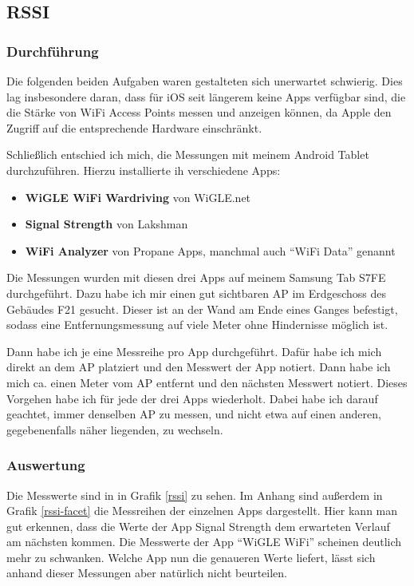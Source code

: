 \subsection{RSSI}
\label{sec:rssi}

\subsubsection*{Durchführung}
Die folgenden beiden Aufgaben waren gestalteten sich unerwartet schwierig. Dies lag insbesondere daran, dass für iOS seit längerem keine Apps verfügbar sind, die die Stärke von WiFi Access Points messen und anzeigen können, da Apple den Zugriff auf die entsprechende Hardware einschränkt.

Schließlich entschied ich mich, die Messungen mit meinem Android Tablet durchzuführen. Hierzu installierte ih verschiedene Apps:

\begin{itemize}
    \item \textbf{WiGLE WiFi Wardriving} von WiGLE.net
    \item \textbf{Signal Strength} von Lakshman
    \item \textbf{WiFi Analyzer} von Propane Apps, manchmal auch \enquote{WiFi Data} genannt
\end{itemize}

Die Messungen wurden mit diesen drei Apps auf meinem Samsung Tab S7FE durchgeführt. Dazu habe ich mir einen gut sichtbaren AP im Erdgeschoss des Gebäudes F21 gesucht. Dieser ist an der Wand am Ende eines Ganges befestigt, sodass eine Entfernungsmessung auf viele Meter ohne Hindernisse möglich ist.

Dann habe ich je eine Messreihe pro App durchgeführt. Dafür habe ich mich direkt an dem AP platziert und den Messwert der App notiert. Dann habe ich mich ca. einen Meter vom AP entfernt und den nächsten Messwert notiert. Dieses Vorgehen habe ich für jede der drei Apps wiederholt. Dabei habe ich darauf geachtet, immer denselben AP zu messen, und nicht etwa auf einen anderen, gegebenenfalls näher liegenden, zu wechseln.

\subsubsection*{Auswertung}

Die Messwerte sind in in Grafik \ref{rssi} zu sehen. Im Anhang sind außerdem in Grafik \ref{rssi-facet} die Messreihen der einzelnen Apps dargestellt. Hier kann man gut erkennen, dass die Werte der App Signal Strength dem erwarteten Verlauf am nächsten kommen. Die Messwerte der App \enquote{WiGLE WiFi} scheinen deutlich mehr zu schwanken. Welche App nun die genaueren Werte liefert, lässt sich anhand dieser Messungen aber natürlich nicht beurteilen.

